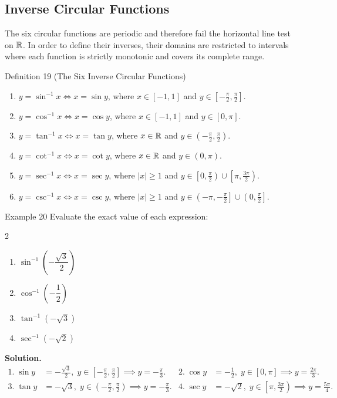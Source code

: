 \subsection*{Inverse Circular Functions}
\label{subsec:1.7.3}

The six circular functions are periodic and therefore fail the horizontal line test on \(\mathbb{R}\). In order to define their inverses, their domains are restricted to intervals where each function is strictly monotonic and covers its complete range.

\begin{definitionbox}{Definition 19 (The Six Inverse Circular Functions)}
\begin{enumerate}
    \item \(y = \sin^{-1} x \iff x = \sin y\), where \(x \in [-1, 1]\) and \(y \in \left[-\frac{\pi}{2}, \frac{\pi}{2}\right]\).
    \item \(y = \cos^{-1} x \iff x = \cos y\), where \(x \in [-1, 1]\) and \(y \in [0, \pi]\).
    \item \(y = \tan^{-1} x \iff x = \tan y\), where \(x \in \mathbb{R}\) and \(y \in \left(-\frac{\pi}{2}, \frac{\pi}{2}\right)\).
    \item \(y = \cot^{-1} x \iff x = \cot y\), where \(x \in \mathbb{R}\) and \(y \in (0, \pi)\).
    \item \(y = \sec^{-1} x \iff x = \sec y\), where \(|x| \ge 1\) and \(y \in \left[0, \frac{\pi}{2}\right) \cup \left[\pi, \frac{3\pi}{2}\right)\).
    \item \(y = \csc^{-1} x \iff x = \csc y\), where \(|x| \ge 1\) and \(y \in \left(-\pi, -\frac{\pi}{2}\right] \cup \left(0, \frac{\pi}{2}\right]\).
\end{enumerate}
\end{definitionbox}

\begin{examplebox}{Example 20}
Evaluate the exact value of each expression:
\begin{multicols}{2}
\begin{enumerate}
    \item \(\sin^{-1}\!\left(-\dfrac{\sqrt{3}}{2}\right)\)
    \item \(\cos^{-1}\!\left(-\dfrac{1}{2}\right)\)
    \item \(\tan^{-1}(-\sqrt{3})\)
    \item \(\sec^{-1}(-\sqrt{2})\)
\end{enumerate}
\end{multicols}

\medskip
\textbf{Solution.}
\begin{align*}
1.\; \sin y &= -\frac{\sqrt{3}}{2}, \; y \in \left[-\frac{\pi}{2}, \frac{\pi}{2}\right] \implies y = -\frac{\pi}{3}. &
2.\; \cos y &= -\frac{1}{2}, \; y \in [0, \pi] \implies y = \frac{2\pi}{3}. \\[4pt]
3.\; \tan y &= -\sqrt{3}, \; y \in \left(-\frac{\pi}{2}, \frac{\pi}{2}\right) \implies y = -\frac{\pi}{3}. &
4.\; \sec y &= -\sqrt{2}, \; y \in \left[\pi, \frac{3\pi}{2}\right) \implies y = \frac{5\pi}{4}.
\end{align*}
\end{examplebox}

